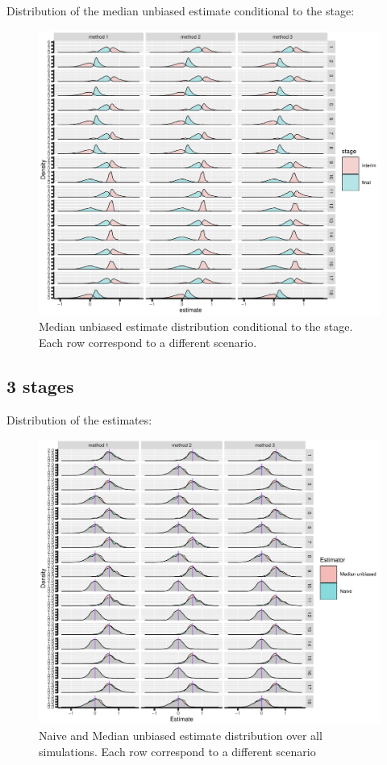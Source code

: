 \documentclass[12pt]{article}
\begin{document}
\clearpage

Distribution of the median unbiased estimate conditional to the stage:
\begin{figure}[!h]
\centering
\includegraphics[trim={0 0 0 0},width=1\textwidth]{./figures/gg2stage-estimateC-density.pdf}
\caption{Median unbiased estimate distribution conditional to the stage. Each row correspond to a different scenario.}
\end{figure}

\clearpage

\subsection{3 stages}
\label{sec:org2e475a8}

Distribution of the estimates:
\begin{figure}[!h]
\centering
\includegraphics[trim={0 0 0 0},width=1\textwidth]{./figures/gg3stage-estimate-density.pdf}
\caption{Naive and Median unbiased estimate distribution over all simulations. Each row correspond to a different scenario}
\end{figure}
\end{document}
